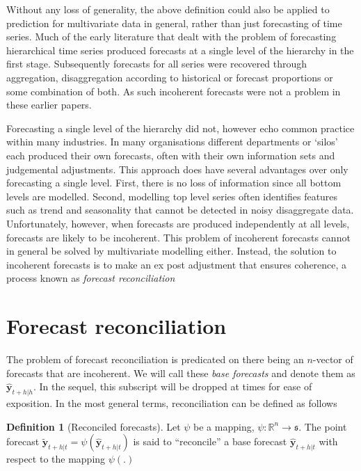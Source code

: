 \documentclass[12pt]{article}
\theoremstyle{definition}
\newtheorem{definition}{Definition}[section]
\theoremstyle{property}
\begin{document}
    Without any loss of generality, the above definition could also be applied to prediction for multivariate data in general, rather than just forecasting of time series.  Much of the early literature that dealt with the problem of forecasting hierarchical time series \citep[see][and references therein]{Gross1990} produced forecasts at a single level of the hierarchy in the first stage. Subsequently forecasts for all series were recovered through aggregation, disaggregation according to historical or forecast proportions or some combination of both.  As such incoherent forecasts were not a problem in these earlier papers.  
    
    Forecasting a single level of the hierarchy did not, however echo common practice within many industries.  In many organisations different departments or `silos' each produced their own forecasts, often with their own information sets and judgemental adjustments.  This approach does have several advantages over only forecasting a single level.  First, there is no loss of information since all bottom levels are modelled.  Second, modelling top level series often identifies features such as trend and seasonality that cannot be detected in noisy disaggregate data.  Unfortunately, however, when forecasts are produced independently at all levels, forecasts are likely to be incoherent.  This problem of incoherent forecasts cannot in general be solved by multivariate modelling either.  Instead, the solution to incoherent forecasts is to make an ex post adjustment that ensures coherence, a process known as {\em forecast reconciliation}
	
	
	
\section{Forecast reconciliation}\label{sec:Reconciliation}
	
	The problem of forecast reconciliation is predicated on there being an $n$-vector of forecasts that are incoherent.  We will call these {\em base forecasts} and denote them as $\hat{\bm{y}}_{t+h|h}$.  In the sequel, this subscript will be dropped at times for ease of exposition.  In the most general terms, reconciliation can be defined as follows
	
	\begin{definition}[Reconciled forecasts]\label{def:reconpoint}
		Let $\psi$ be a mapping, $\psi:\mathbb{R}^n\rightarrow\mathfrak{s}$.  The point forecast $\tilde{\bm{y}}_{t+h|t}=\psi\left(\hat{\bm{y}}_{t+h|t}\right)$ is said to ``reconcile'' a base forecast $\hat{\bm{y}}_{t+h|t}$ with respect to the mapping $\psi(.)$
	\end{definition}
	
\end{document}
